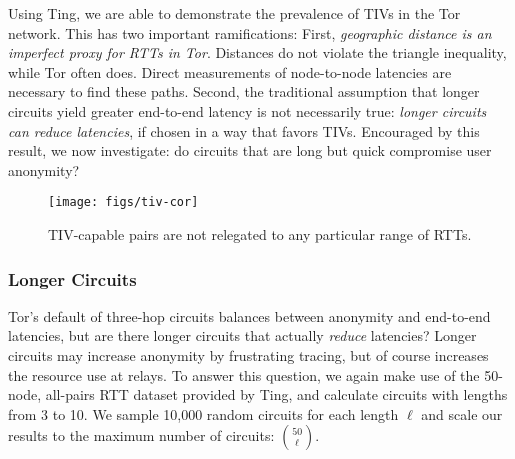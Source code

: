 

Using Ting, we are able to demonstrate the prevalence of TIVs in the
Tor network.
%
This has two important ramifications:
%
First, \emph{geographic distance is an imperfect proxy for RTTs in Tor}.
%
Distances do not violate the triangle inequality, while Tor often does.
%
Direct measurements of node-to-node latencies are necessary to 
find these paths.
%
Second, the traditional assumption that longer circuits yield
greater end-to-end latency is not necessarily true: 
\emph{longer circuits can reduce latencies}, if chosen in a way that
favors TIVs.
%
Encouraged by this result, we now investigate: do circuits that are
long but quick compromise user anonymity?




\begin{figure}[t!]
\centering
%
\texttt{[image: figs/tiv-cor]}
\caption{\label{fig:tiv-cor} TIV-capable pairs are not relegated to
any particular range of RTTs.}
%
\end{figure}


\newpage
\subsubsection{Longer Circuits} %
\label{sec:longercirc}



Tor's default of three-hop circuits balances between ano\-nymity and
end-to-end latencies, but are there longer circuits that actually
\emph{reduce} latencies? Longer circuits may increase anonymity by
frustrating tracing, but of course increases the resource use at relays.
%
To answer this question, we again make use of the 50-node, all-pairs
RTT dataset provided by Ting, and calculate circuits with lengths 
from 3 to 10.
%
We sample 10,000 random circuits for each length $\ell$ and scale our
results to the maximum number of circuits: $50 \choose \ell$.


\medskip

